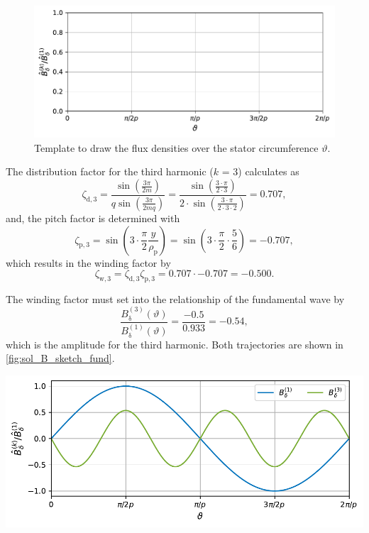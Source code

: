 \begin{figure}[ht!]
    \centering
    \includegraphics{fig/B_sketch_fund.pdf}
    \caption{Template to draw the flux densities over the stator circumference $\vartheta$.}
    \label{fig:B_sketch_fund}
\end{figure}%

\begin{solutionblock}
    The distribution factor for the third harmonic ($k$ = 3) calculates as
    $$\zeta_{\mathrm{d,}3} = \frac{\sin\left(\frac{3\pi}{2m} \right)}{q\sin\left(\frac{3\pi}{2mq} \right)} 
    = \frac{\sin\left(\frac{3\cdot \pi}{2\cdot3}\right)}{2 \cdot \sin\left(\frac{3\cdot \pi}{2\cdot3\cdot 2} \right)}
    = 0.707,
    $$
    and, the pitch factor is determined with
    $$
    \zeta_{\mathrm{p,}3} = \sin\left(3 \cdot \frac{\pi}{2} \frac{y}{\rho_{\mathrm{p}}}\right)
    = \sin\left(3 \cdot \frac{\pi}{2} \cdot \frac{5}{6} \right) = -0.707,
    $$
    which results in the winding factor by
    $$ \zeta_{\mathrm{w,}3} =  \zeta_{\mathrm{d,}3}  \zeta_{\mathrm{p,}3} = 0.707 \cdot -0.707 = -0.500. $$

    The winding factor must set into the relationship of the fundamental wave by
    $$ \frac{B_{\updelta}^{(3)}(\vartheta)}{B_{\updelta}^{(1)}(\vartheta)} = \frac{-0.5}{0.933} = -0.54, $$
    which is the amplitude for the third harmonic. Both trajectories are shown in \autoref{fig:sol_B_sketch_fund}.

    \begin{solutionfigure}[ht!]
    \centering
    \includegraphics{fig/sol_B_sketch_fund.pdf}
    \caption{Solution trajectories for $B_{\updelta}^{(1)}(\vartheta)$ and $B_{\updelta}^{(3)}(\vartheta)$.}
    \label{fig:sol_B_sketch_fund}
    \end{solutionfigure}
\end{solutionblock}



